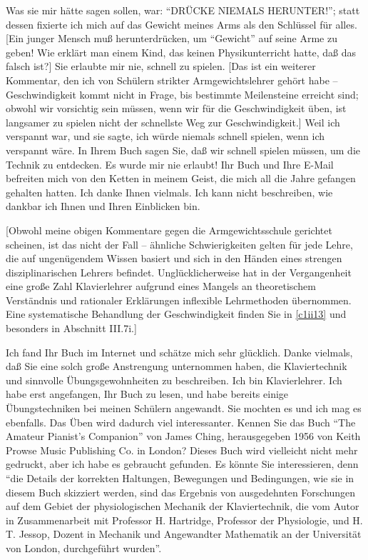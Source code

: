 Was sie mir hätte sagen sollen, war: \enquote{DRÜCKE NIEMALS HERUNTER!}; statt dessen fixierte ich mich auf das Gewicht meines Arms als den Schlüssel für alles.
[Ein junger Mensch muß herunterdrücken, um \enquote{Gewicht} auf seine Arme zu geben!
Wie erklärt man einem Kind, das keinen Physikunterricht hatte, daß das falsch ist?]
Sie erlaubte mir nie, schnell zu spielen.
[Das ist ein weiterer Kommentar, den ich von Schülern strikter Armgewichtslehrer gehört habe -- Geschwindigkeit kommt nicht in Frage, bis bestimmte Meilensteine erreicht sind; obwohl wir vorsichtig sein müssen, wenn wir für die Geschwindigkeit üben, ist langsamer zu spielen nicht der schnellste Weg zur Geschwindigkeit.]
Weil ich verspannt war, und sie sagte, ich würde niemals schnell spielen, wenn ich verspannt wäre.
In Ihrem Buch sagen Sie, daß wir schnell spielen müssen, um die Technik zu entdecken.
Es wurde mir nie erlaubt!
Ihr Buch und Ihre E-Mail befreiten mich von den Ketten in meinem Geist, die mich all die Jahre gefangen gehalten hatten.
Ich danke Ihnen vielmals.
Ich kann nicht beschreiben, wie dankbar ich Ihnen und Ihren Einblicken bin.

[Obwohl meine obigen Kommentare gegen die Armgewichtsschule gerichtet scheinen, ist das nicht der Fall -- ähnliche Schwierigkeiten gelten für jede Lehre, die auf ungenügendem Wissen basiert und sich in den Händen eines strengen disziplinarischen Lehrers befindet.
Unglücklicherweise hat in der Vergangenheit eine große Zahl Klavierlehrer aufgrund eines Mangels an theoretischem Verständnis und rationaler Erklärungen inflexible Lehrmethoden übernommen.
Eine systematische Behandlung der Geschwindigkeit finden Sie in \hyperref[c1ii13]{\autoref{c1ii13}} und besonders in Abschnitt III.7i.]


\item \label{testimonials07}
Ich fand Ihr Buch im Internet und schätze mich sehr glücklich.
Danke vielmals, daß Sie eine solch große Anstrengung unternommen haben, die Klaviertechnik und sinnvolle Übungsgewohnheiten zu beschreiben.
Ich bin Klavierlehrer.
Ich habe erst angefangen, Ihr Buch zu lesen, und habe bereits einige Übungstechniken bei meinen Schülern angewandt.
Sie mochten es und ich mag es ebenfalls.
Das Üben wird dadurch viel interessanter.
Kennen Sie das Buch \enquote{The Amateur Pianist's Companion} von James Ching, herausgegeben 1956 von Keith Prowse Music Publishing Co. in London?
Dieses Buch wird vielleicht nicht mehr gedruckt, aber ich habe es gebraucht gefunden.
Es könnte Sie interessieren, denn \enquote{die Details der korrekten Haltungen, Bewegungen und Bedingungen, wie sie in diesem Buch skizziert werden, sind das Ergebnis von ausgedehnten Forschungen auf dem Gebiet der physiologischen Mechanik der Klaviertechnik, die vom Autor in Zusammenarbeit mit Professor H. Hartridge, Professor der Physiologie, und H. T. Jessop, Dozent in Mechanik und Angewandter Mathematik an der Universität von London, durchgeführt wurden}.


